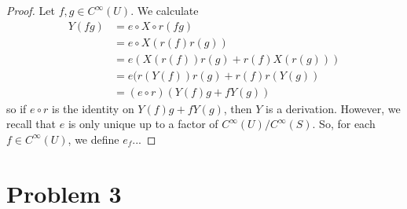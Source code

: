 \documentclass[fontsize=11pt]{scrartcl} %
\numberwithin{equation}{section} %
\numberwithin{figure}{section} %
\numberwithin{table}{section} %
\begin{document}
\begin{proof}
    Let $f,g\in
    C^{\infty}(U)$. We calculate
    \[
        \begin{aligned}
            Y(fg) &= e\circ X\circ r(fg)\\
                    &= e\circ X(r(f)r(g))\\
                    &= e(X(r(f))r(g) + r(f)X(r(g)))\\
                    &= e(r(Y(f))r(g) +r(f)r(Y(g))\\
                    &= (e\circ r)(Y(f)g + fY(g))
        \end{aligned}
    \]
    so if $e\circ r$ is the identity on $Y(f)g + fY(g)$, then $Y$ is a
    derivation. However, we recall that $e$ is only unique up to a factor of
    $C^{\infty}(U)/{C^{\infty}(S)}$. So, for each $f\in C^{\infty}(U)$, we
    define $e_f$... %
\end{proof}

\section*{Problem 3} %
\end{document}
